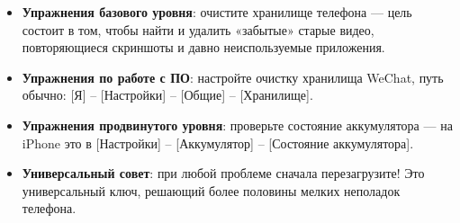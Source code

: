 
\begin{itemize}
  \item \textbf{Упражнения базового уровня}: очистите хранилище телефона — цель состоит в том, чтобы найти и удалить «забытые» старые видео, повторяющиеся скриншоты и давно неиспользуемые приложения.
  \item \textbf{Упражнения по работе с ПО}: настройте очистку хранилища WeChat, путь обычно: [Я] – [Настройки] – [Общие] – [Хранилище].
  \item \textbf{Упражнения продвинутого уровня}: проверьте состояние аккумулятора — на iPhone это в [Настройки] – [Аккумулятор] – [Состояние аккумулятора].
  \item \textbf{Универсальный совет}: при любой проблеме сначала перезагрузите! Это универсальный ключ, решающий более половины мелких неполадок телефона.
\end{itemize}
